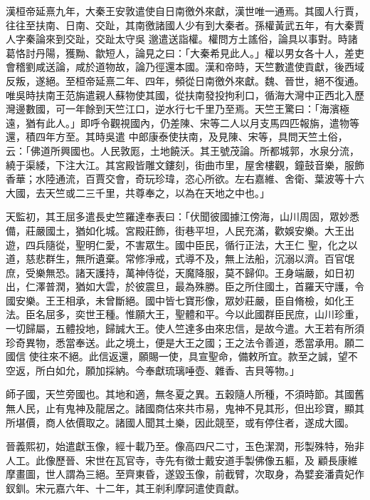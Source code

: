 \begin{pinyinscope}
 漢桓帝延熹九年，大秦王安敦遣使自日南徼外來獻，漢世唯一通焉。其國人行賈，往往至扶南、日南、交趾，其南徼諸國人少有到大秦者。孫權黃武五年，有大秦賈人字秦論來到交趾，交趾太守吳
 邈遣送詣權。權問方土謠俗，論具以事對。時諸葛恪討丹陽，獲黝、歙短人，論見之曰：「大秦希見此人。」權以男女各十人，差吏會稽劉咸送論，咸於道物故，論乃徑還本國。漢和帝時，天竺數遣使貢獻，後西域反叛，遂絕。至桓帝延熹二年、四年，頻從日南徼外來獻。魏、晉世，絕不復通。唯吳時扶南王范旃遣親人蘇物使其國，從扶南發投拘利口，循海大灣中正西北入歷灣邊數國，可一年餘到天竺江口，逆水行七千里乃至焉。天竺王驚曰：「海濱極遠，猶有此人。」即呼令觀視國內，仍差陳、宋等二人以月支馬四匹報旃，遣物等還，積四年方至。其時吳遣
 中郎康泰使扶南，及見陳、宋等，具問天竺土俗，云：「佛道所興國也。人民敦厖，土地饒沃。其王號茂論。所都城郭，水泉分流，繞于渠緌，下注大江。其宮殿皆雕文鏤刻，街曲市里，屋舍樓觀，鐘鼓音樂，服飾香華；水陸通流，百賈交會，奇玩珍瑋，恣心所欲。左右嘉維、舍衛、葉波等十六大國，去天竺或二三千里，共尊奉之，以為在天地之中也。」



 天監初，其王屈多遣長史竺羅達奉表曰：「伏聞彼國據江傍海，山川周固，眾妙悉備，莊嚴國土，猶如化城。宮殿莊飾，街巷平坦，人民充滿，歡娛安樂。大王出遊，四兵隨從，聖明仁愛，不害眾生。國中臣民，循行正法，大王仁
 聖，化之以道，慈悲群生，無所遺棄。常修凈戒，式導不及，無上法船，沉溺以濟。百官氓庶，受樂無恐。諸天護持，萬神侍從，天魔降服，莫不歸仰。王身端嚴，如日初出，仁澤普潤，猶如大雲，於彼震旦，最為殊勝。臣之所住國土，首羅天守護，令國安樂。王王相承，未曾斷絕。國中皆七寶形像，眾妙莊嚴，臣自脩檢，如化王法。臣名屈多，奕世王種。惟願大王，聖體和平。今以此國群臣民庶，山川珍重，一切歸屬，五體投地，歸誠大王。使人竺達多由來忠信，是故今遣。大王若有所須珍奇異物，悉當奉送。此之境土，便是大王之國；王之法令善道，悉當承用。願二國信
 使往來不絕。此信返還，願賜一使，具宣聖命，備敕所宜。款至之誠，望不空返，所白如允，願加採納。今奉獻琉璃唾壺、雜香、吉貝等物。」



 師子國，天竺旁國也。其地和適，無冬夏之異。五穀隨人所種，不須時節。其國舊無人民，止有鬼神及龍居之。諸國商估來共市易，鬼神不見其形，但出珍寶，顯其所堪價，商人依價取之。諸國人聞其土樂，因此競至，或有停住者，遂成大國。



 晉義熙初，始遣獻玉像，經十載乃至。像高四尺二寸，玉色潔潤，形製殊特，殆非人工。此像歷晉、宋世在瓦官寺，寺先有徵士戴安道手製佛像五軀，及
 顧長康維摩畫圖，世人謂為三絕。至齊東昏，遂毀玉像，前截臂，次取身，為嬖妾潘貴妃作釵釧。宋元嘉六年、十二年，其王剎利摩訶遣使貢獻。




\end{pinyinscope}
